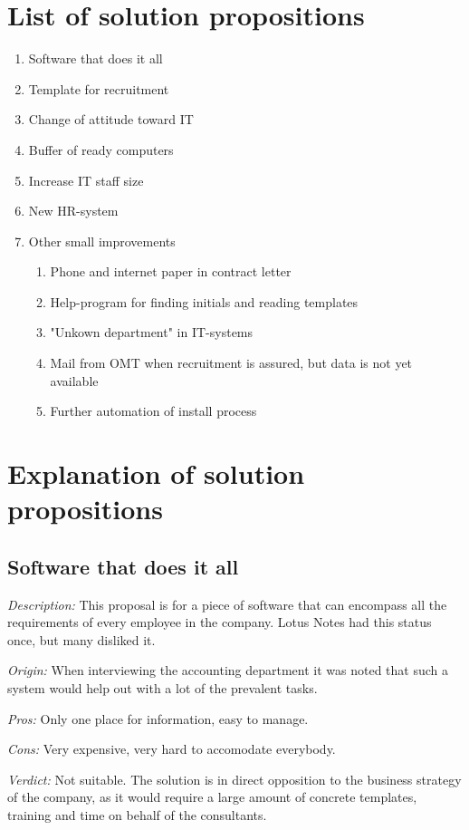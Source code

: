 \label{app:solution_propositions}
\section{List of solution propositions}
\begin{enumerate}
\item Software that does it all
\item Template for recruitment
\item Change of attitude toward IT
\item Buffer of ready computers
\item Increase IT staff size
\item New HR-system
\item Other small improvements
	\begin{enumerate}
	\item Phone and internet paper in contract letter
	\item Help-program for finding initials and reading templates
	\item "Unkown department" in IT-systems
	\item Mail from OMT when recruitment is assured, but data is not yet available
	\item Further automation of install process
	\end{enumerate}
\end{enumerate}

\section{Explanation of solution propositions}
\subsection{Software that does it all}
\emph{Description:} This proposal is for a piece of software that can encompass all the requirements of every employee in the company. Lotus Notes had this status once, but many disliked it.

\emph{Origin:}
When interviewing the accounting department it was noted that such a system would help out with a lot of the prevalent tasks.

\noindent \emph{Pros:} Only one place for information, easy to manage.

\noindent \emph{Cons:} Very expensive, very hard to accomodate everybody.

\emph {Verdict:}
Not suitable. The solution is in direct opposition to the business strategy of the company, as it would require a large amount of concrete templates, training and time on behalf of the consultants.

